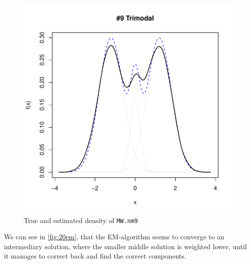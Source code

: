 \begin{figure}[h]
    \begin{Rgraph}[0.9]
\includegraphics{chapter1-figTrimodal}
    \caption{True and estimated density of {\tt MW.nm9}}
    \label{fig:MW.nm9}
    \end{Rgraph}
\end{figure}

We can see in \ref{fig:20em}, that the EM-algorithm seems to converge to an 
intermediary solution, where the smaller middle solution is weighted lower, 
until it manages to correct back and find the correct components.



